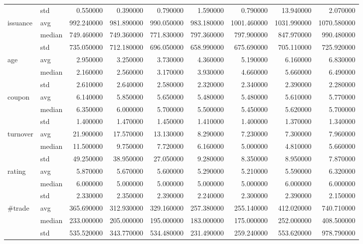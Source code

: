 \documentclass{article}
\begin{document}
\begin{landscape}
\begin{table}[ht]
\begin{tabular}{llrrrrrrr}
 & std & 0.550000 & 0.390000 & 0.790000 & 1.590000 & 0.790000 & 13.940000 & 2.070000 \\
\cline{1-9}
\multirow[t]{3}{*}{issuance} & avg & 992.240000 & 981.890000 & 990.050000 & 983.180000 & 1001.460000 & 1031.990000 & 1070.580000 \\
 & median & 749.460000 & 749.360000 & 771.830000 & 797.360000 & 797.900000 & 847.970000 & 990.480000 \\
 & std & 735.050000 & 712.180000 & 696.050000 & 658.990000 & 675.690000 & 705.110000 & 725.920000 \\
\cline{1-9}
\multirow[t]{3}{*}{age} & avg & 2.950000 & 3.250000 & 3.730000 & 4.360000 & 5.190000 & 6.160000 & 6.830000 \\
 & median & 2.160000 & 2.560000 & 3.170000 & 3.930000 & 4.660000 & 5.660000 & 6.490000 \\
 & std & 2.610000 & 2.640000 & 2.580000 & 2.320000 & 2.340000 & 2.390000 & 2.280000 \\
\cline{1-9}
\multirow[t]{3}{*}{coupon} & avg & 6.140000 & 5.850000 & 5.650000 & 5.480000 & 5.480000 & 5.610000 & 5.770000 \\
 & median & 6.350000 & 6.000000 & 5.700000 & 5.500000 & 5.450000 & 5.620000 & 5.700000 \\
 & std & 1.400000 & 1.470000 & 1.450000 & 1.410000 & 1.400000 & 1.370000 & 1.340000 \\
\cline{1-9}
\multirow[t]{3}{*}{turnover} & avg & 21.900000 & 17.570000 & 13.130000 & 8.290000 & 7.230000 & 7.300000 & 7.960000 \\
 & median & 11.500000 & 9.750000 & 7.720000 & 6.160000 & 5.000000 & 4.810000 & 5.660000 \\
 & std & 49.250000 & 38.950000 & 27.050000 & 9.280000 & 8.350000 & 8.950000 & 7.870000 \\
\cline{1-9}
\multirow[t]{3}{*}{rating} & avg & 5.870000 & 5.670000 & 5.600000 & 5.290000 & 5.210000 & 5.590000 & 6.320000 \\
 & median & 6.000000 & 5.000000 & 5.000000 & 5.000000 & 5.000000 & 6.000000 & 6.000000 \\
 & std & 2.330000 & 2.350000 & 2.390000 & 2.240000 & 2.300000 & 2.390000 & 2.150000 \\
\cline{1-9}
\multirow[t]{3}{*}{#trade} & avg & 365.690000 & 312.930000 & 329.160000 & 257.380000 & 255.140000 & 412.020000 & 740.710000 \\
 & median & 233.000000 & 205.000000 & 195.000000 & 183.000000 & 175.000000 & 252.000000 & 408.500000 \\
 & std & 535.520000 & 343.770000 & 534.480000 & 231.490000 & 259.240000 & 553.620000 & 978.790000 \\
\cline{1-9}
\bottomrule
\end{tabular}



\end{table}
\end{landscape}
\end{document}
